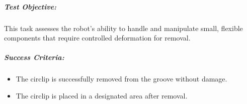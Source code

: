 \documentclass[letterpaper,10pt,english]{sphinxmanual}
\begin{document}
\subparagraph{Test Objective:}
\label{\detokenize{robotic_instructions_elastic_deformation:id8}}
\sphinxAtStartPar
This task assesses the robot’s ability to handle and manipulate small, flexible components that require controlled deformation for removal.


\subparagraph{Success Criteria:}
\label{\detokenize{robotic_instructions_elastic_deformation:id9}}\begin{itemize}
\item {} 
\sphinxAtStartPar
The circlip is successfully removed from the groove without damage.

\item {} 
\sphinxAtStartPar
The circlip is placed in a designated area after removal.

\end{itemize}



\renewcommand{\indexname}{Index}
\printindex
\end{document}
